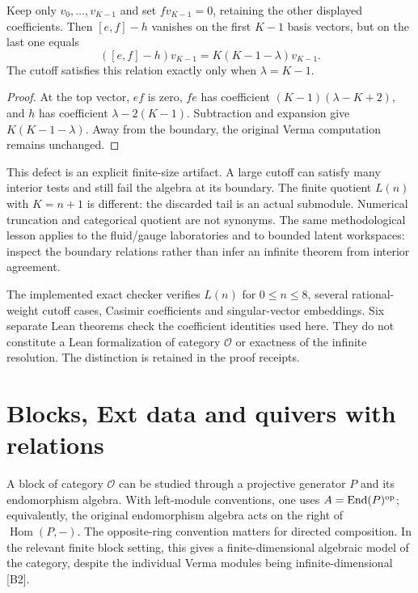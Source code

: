 \begin{proposition}
Keep only $v_0,\ldots,v_{K-1}$ and set $fv_{K-1}=0$, retaining the other displayed coefficients. Then $[e,f]-h$ vanishes on the first $K-1$ basis vectors, but on the last one equals
\[
 ([e,f]-h)v_{K-1}=K(K-1-\lambda)v_{K-1}.
\]
The cutoff satisfies this relation exactly only when $\lambda=K-1$.
\end{proposition}
\begin{proof}
At the top vector, $ef$ is zero, $fe$ has coefficient $(K-1)(\lambda-K+2)$, and $h$ has coefficient $\lambda-2(K-1)$. Subtraction and expansion give $K(K-1-\lambda)$. Away from the boundary, the original Verma computation remains unchanged.
\end{proof}

This defect is an explicit finite-size artifact. A large cutoff can satisfy many interior tests and still fail the algebra at its boundary. The finite quotient $L(n)$ with $K=n+1$ is different: the discarded tail is an actual submodule. Numerical truncation and categorical quotient are not synonyms. The same methodological lesson applies to the fluid/gauge laboratories and to bounded latent workspaces: inspect the boundary relations rather than infer an infinite theorem from interior agreement.

The implemented exact checker verifies $L(n)$ for $0\le n\le8$, several rational-weight cutoff cases, Casimir coefficients and singular-vector embeddings. Six separate Lean theorems check the coefficient identities used here. They do not constitute a Lean formalization of category $\mathcal O$ or exactness of the infinite resolution. The distinction is retained in the proof receipts.

\section{Blocks, Ext data and quivers with relations}
\label{sec:wb-bgg-blocks}

A block of category $\mathcal O$ can be studied through a projective generator $P$ and its endomorphism algebra. With left-module conventions, one uses $A=\operatorname{End}(P)^{\rm op}$; equivalently, the original endomorphism algebra acts on the right of $\operatorname{Hom}(P,-)$. The opposite-ring convention matters for directed composition. In the relevant finite block setting, this gives a finite-dimensional algebraic model of the category, despite the individual Verma modules being infinite-dimensional [B2].

